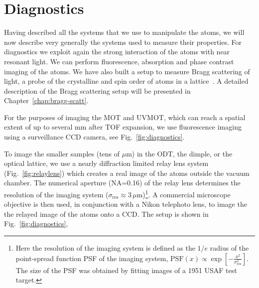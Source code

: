 \section{Diagnostics}

Having described all the systems that we use to manipulate the atoms, we will
now describe very generally the systems used to measure their properties.  For
diagnostics we exploit again the strong interaction of the atoms with near
resonant light.   We can perform fluorescence, absorption and phase contrast
imaging of the atoms.   We have also built a setup to measure  Bragg scattering
of light, a probe of the crystalline and spin order of atoms in a
lattice~\cite{Ted2010}. A detailed description of the Bragg scattering setup will be
presented in Chapter~\ref{chap:bragg-scatt}.    

For the purposes of imaging the MOT and UVMOT, which can reach a spatial extent
of up to several mm after TOF expansion, we use fluorescence imaging
using a surveillance CCD camera, see Fig.~\ref{fig:diagnostics}. 

To image the smaller samples (tens of $\mu$m) in the ODT, the dimple, or the
optical lattice,  we use a nearly diffraction limited relay lens system
(Fig.~\ref{fig:relaylens}) which creates a real image of the atoms outside the
vacuum chamber.  The numerical aperture (NA=0.16) of the relay lens determines
the resolution of the imaging system
($\sigma_{\mathrm{res}}\approx3\,\mu$m)\footnote{Here the resolution of the
imaging system is defined as the $1/e$ radius of the point-spread function PSF
of the imaging system, $\mathrm{PSF}(x)\propto \exp\left[
-\frac{x^{2}}{\sigma_{\mathrm{res}}^{2}} \right]$.  The size of the PSF was
obtained by fitting images of a 1951 USAF test target.}.   A commercial
microscope objective is then used, in conjunction with a Nikon telephoto lens,
to image the the relayed image of the atoms onto a CCD.   The setup is shown in
Fig.~\ref{fig:diagnostics}, 

